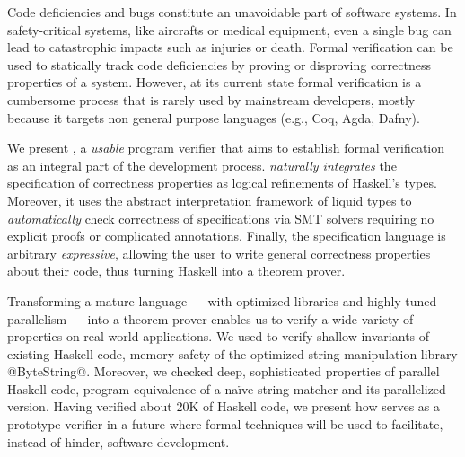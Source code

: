 Code deficiencies and bugs constitute an unavoidable part of software systems.
%
In safety-critical systems, like aircrafts or medical equipment, 
even a single bug can lead to catastrophic impacts
such as injuries or death.
%
Formal verification can be used to statically 
track code deficiencies by proving or disproving correctness properties 
of a system. 
%
However, at its current state formal verification is a cumbersome process
that is rarely used by mainstream developers, mostly because it targets non general purpose languages (e.g., Coq, Agda, Dafny).

We present \toolname, a \textit{usable} program verifier that aims to
establish formal verification as an
integral part of the development process.
%
\toolname \textit{naturally integrates}
the specification of correctness properties
as logical refinements of Haskell's types. 
%
Moreover, it uses the abstract interpretation framework of liquid types
to \textit{automatically} check correctness of specifications via SMT solvers
requiring no explicit proofs or complicated annotations.
%
Finally, the specification language is arbitrary \textit{expressive},
allowing the user to write general correctness properties about their code, 
thus turning Haskell into a theorem prover. 

Transforming a mature language 
--- with optimized libraries and highly tuned parallelism ---
into a theorem prover enables us to verify a wide variety of properties 
on real world applications.
%
We used \toolname to verify shallow invariants of existing Haskell code, 
\eg memory safety of the optimized string manipulation library @ByteString@.
%
Moreover, we checked deep, sophisticated properties of parallel Haskell code, 
\eg program equivalence of a na\"ive string matcher and its parallelized version. 
%
Having verified about 20K of Haskell code, we present how \toolname 
serves as a prototype verifier in a future where formal techniques will 
be used to facilitate, instead of hinder, software development. 